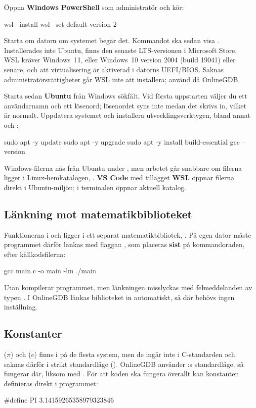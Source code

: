 Öppna \textbf{Windows PowerShell} som administratör och kör:
\begin{shell}
wsl --install
wsl --set-default-version 2
\end{shell}
Starta om datorn om systemet begär det. Kommandot  ska sedan visa
. Installerades inte Ubuntu, finns den senaste LTS-versionen i Microsoft
Store. WSL kräver Windows~11, eller Windows~10 version 2004 (build 19041) eller senare, och att
virtualisering är aktiverad i datorns UEFI/BIOS. Saknas administratörsrättigheter går WSL inte att
installera; använd då OnlineGDB.

Starta sedan \textbf{Ubuntu} från Windows sökfält. Vid första uppstarten väljer du ett
användarnamn och ett lösenord; lösenordet syns inte medan det skrivs in, vilket är normalt.
Uppdatera systemet och installera utvecklingsverktygen, bland annat  och :
\begin{shell}
sudo apt -y update
sudo apt -y upgrade
sudo apt -y install build-essential
gcc --version
\end{shell}
Windows-filerna nås från Ubuntu under , men arbetet går snabbare om filerna ligger i
Linux-hemkatalogen, \code{~}. \textbf{VS Code} med tillägget \textbf{WSL} öppnar filerna direkt i
Ubuntu-miljön;  i terminalen öppnar aktuell katalog.

\subsection{Länkning mot matematikbiblioteket}
\label{c18:sec:lankning}
Funktionerna i  och  ligger i ett separat matematikbibliotek,
. På egen dator måste programmet därför länkas med flaggan , som placeras
\textbf{sist} på kommandoraden, efter källkodsfilerna:
\begin{shell}
gcc main.c -o main -lm
./main
\end{shell}
Utan  kompilerar programmet, men länkningen misslyckas med felmeddelanden av typen
. I OnlineGDB länkas biblioteket in automatiskt, så där
behövs ingen inställning.

\subsection{Konstanter}
\label{c18:sec:konstanter}
 ($\pi$) och  ($e$) finns i  på de flesta system, men de ingår
inte i C-standarden och saknas därför i strikt standardläge (). OnlineGDB använder
:s standardläge, så  fungerar där, liksom med . För att
koden ska fungera överallt kan konstanten definieras direkt i programmet:
\begin{ccode}
#define PI 3.14159265358979323846
\end{ccode}


